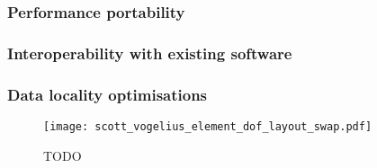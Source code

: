 \documentclass[thesis]{subfiles}
\begin{document}
\subsubsection{Performance portability}




\subsubsection{Interoperability with existing software}





\subsubsection{Data locality optimisations}
\label{sec:intro_mesh_numbering}




\begin{figure}
  \centering
  \texttt{[image: scott\_vogelius\_element\_dof\_layout\_swap.pdf]}
  \caption{
    TODO
  }
  \label{fig:scott_vogelius_element_dof_layout_swap}
\end{figure}
\end{document}

